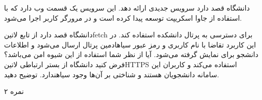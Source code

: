 \documentclass[../main.tex]{subfiles}
\begin{document}

دانشگاه قصد دارد سرویس جدیدی ارائه دهد.
این سرویس یک قسمت وب دارد که با استفاده از جاوا اسکریپت توسعه پیدا
کرده است و در مرورگر کاربر اجرا می‌شود.

دانشگاه قصد دارد از تابع ‌لاتین{fetch} برای دسترسی به پرتال دانشکده استفاده کند.
در این کاربرد تقاضا با نام کاربری و رمز عبور ‌سیاه{ادمین} پرتال ارسال می‌شود و اطلاعات دانشجو برای نمایش گرفته می‌شود.
آیا از نظر شما استفاده از این شیوه امن می‌باشد؟ فرض کنید دانشگاه از بستر ارتباطی ‌لاتین{HTTPS} استفاده می‌کند و
کاربران این سامانه دانشجویان هستند و شناختی بر آن‌ها وجود ‌سیاه{ندارد}.
توضیح دهید.

۲ نمره

\end{document}
